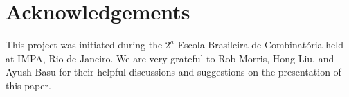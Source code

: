 \documentclass[a4paper,reqno,11pt]{amsart}
\theoremstyle{definition}
\theoremstyle{remark}
\begin{document}
\section*{Acknowledgements}
This project was initiated during the $2^a$ Escola Brasileira de Combinatória held at IMPA, Rio de Janeiro. We are very grateful to Rob Morris, Hong Liu, and Ayush Basu for their helpful discussions and suggestions on the presentation of this paper.

\bigskip

\def\bibfont{\footnotesize}

\end{document}
